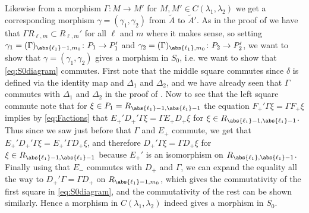 Likewise from a morphism $\Gamma\colon M\to M'$ for $M,M'\in C(\lambda_1,\lambda_2)$ we get a corresponding morphism $\gamma=(\gamma_1,\gamma_2)$ from $\widetilde{A}$ to $\widetilde{A}'$. As in the proof of  we have that $\Gamma R_{\ell,m} \subset R_{\ell,m}'$ for all $\ell$ and $m$ where it makes sense, so setting $\gamma_1=(\Gamma)_{\abs{\ell_1}-1,m_0}\colon P_1\to P_1'$ and $\gamma_2 = (\Gamma)_{\abs{\ell_1},m_0}\colon P_2\to P_2'$, we want to show that $\gamma=(\gamma_1,\gamma_2)$ gives a morphism in $S_0$, i.e. we want to show that \cref{eq:S0diagram} commutes. First note that the middle square commutes since $\delta$ is defined via the identity map and $\Delta_1$ and $\Delta_2$, and we have already seen that $\Gamma$ commutes with $\Delta_1$ and $\Delta_2$ in the proof of . Now to see that the left square commute note that for $\xi\in P_1 = R_{\abs{\ell_1}-1,\abs{\ell_1}-1}$ the equation $F_+'\Gamma\xi = \Gamma F_+\xi$ implies by \cref{eq:Factions} that $E_+'D_+'\Gamma\xi = \Gamma E_+D_+\xi$ for $\xi \in R_{\abs{\ell_1}-1,\abs{\ell_1}-1}$. Thus since we saw just before  that $\Gamma$ and $E_+$ commute, we get that $E_+'D_+'\Gamma\xi = E_+'\Gamma D_+\xi$, and therefore $D_+'\Gamma\xi = \Gamma D_+\xi$ for $\xi\in R_{\abs{\ell_1}-1,\abs{\ell_1}-1}$ because $E_+'$ is an isomorphism on $R_{\abs{\ell_1},\abs{\ell_1}-1}$. Finally using that $E_-$ commutes with $D_+$ and $\Gamma$, we can expand the equality all the way to $D_+'\Gamma = \Gamma D_+$ on $R_{\abs{\ell_1}-1,m_0}$, which gives the commutativity of the first square in \cref{eq:S0diagram}, and the commutativity of the rest can be shown similarly. Hence a morphism in $C(\lambda_1,\lambda_2)$ indeed gives a morphism in $S_0$. 

